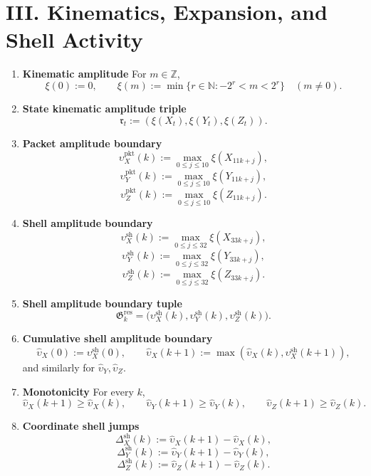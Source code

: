 \documentclass[11pt,letterpaper]{article}
\theoremstyle{plain}
\theoremstyle{definition}
\theoremstyle{remark}
\newcommand{\KinAmp}{\xi}
\newcommand{\AmpBound}{\upsilon}
\begin{document}
\section*{III. Kinematics, Expansion, and Shell Activity}

\begin{enumerate}[resume]
\item \textbf{Kinematic amplitude}
For \(m\in\mathbb Z\),
\[
\KinAmp(0):=0,\qquad
\KinAmp(m):=\min\{r\in\mathbb N:-2^r<m<2^r\}\quad(m\neq 0).
\]

\item \textbf{State kinematic amplitude triple}
\[
\mathfrak r_t:=(\KinAmp(X_t),\KinAmp(Y_t),\KinAmp(Z_t)).
\]

\item \textbf{Packet amplitude boundary}
\[
\AmpBound_X^{\mathrm{pkt}}(k):=\max_{0\le j\le 10}\KinAmp(X_{11k+j}),
\]
\[
\AmpBound_Y^{\mathrm{pkt}}(k):=\max_{0\le j\le 10}\KinAmp(Y_{11k+j}),
\]
\[
\AmpBound_Z^{\mathrm{pkt}}(k):=\max_{0\le j\le 10}\KinAmp(Z_{11k+j}).
\]

\item \textbf{Shell amplitude boundary}
\[
\AmpBound_X^{\mathrm{sh}}(k):=\max_{0\le j\le 32}\KinAmp(X_{33k+j}),
\]
\[
\AmpBound_Y^{\mathrm{sh}}(k):=\max_{0\le j\le 32}\KinAmp(Y_{33k+j}),
\]
\[
\AmpBound_Z^{\mathrm{sh}}(k):=\max_{0\le j\le 32}\KinAmp(Z_{33k+j}).
\]

\item \textbf{Shell amplitude boundary tuple}
\[
\mathfrak G_k^{\mathrm{res}}=
\big(\AmpBound_X^{\mathrm{sh}}(k),\AmpBound_Y^{\mathrm{sh}}(k),\AmpBound_Z^{\mathrm{sh}}(k)\big).
\]

\item \textbf{Cumulative shell amplitude boundary}
\[
\widehat\AmpBound_X(0):=\AmpBound_X^{\mathrm{sh}}(0),\qquad
\widehat\AmpBound_X(k+1):=\max(\widehat\AmpBound_X(k),\AmpBound_X^{\mathrm{sh}}(k+1)),
\]
and similarly for \(\widehat\AmpBound_Y,\widehat\AmpBound_Z\).

\item \textbf{Monotonicity}
For every \(k\),
\[
\widehat\AmpBound_X(k+1)\ge \widehat\AmpBound_X(k),\qquad
\widehat\AmpBound_Y(k+1)\ge \widehat\AmpBound_Y(k),\qquad
\widehat\AmpBound_Z(k+1)\ge \widehat\AmpBound_Z(k).
\]

\item \textbf{Coordinate shell jumps}
\[
\Delta_X^{\mathrm{sh}}(k):=\widehat\AmpBound_X(k+1)-\widehat\AmpBound_X(k),
\]
\[
\Delta_Y^{\mathrm{sh}}(k):=\widehat\AmpBound_Y(k+1)-\widehat\AmpBound_Y(k),
\]
\[
\Delta_Z^{\mathrm{sh}}(k):=\widehat\AmpBound_Z(k+1)-\widehat\AmpBound_Z(k).
\]


\end{enumerate}
\end{document}
